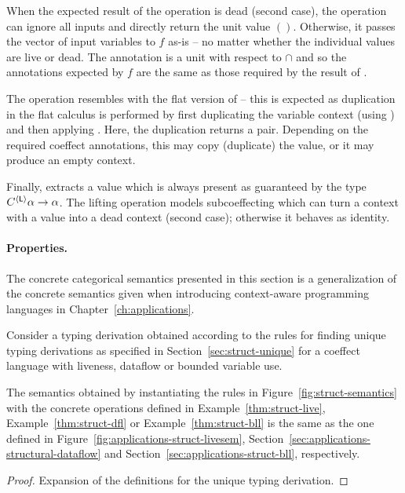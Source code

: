 \noindent
When the expected result of the  operation is dead (second case), the operation can
ignore all inputs and directly return the unit value $()$. Otherwise, it passes the vector of
input variables to $f$ as-is -- no matter whether the individual values are live or dead. The
 annotation is a unit with respect to $\cap$ and so the annotations expected by $f$ are
the same as those required by the result of .

The  operation resembles with the flat version of  -- this is expected as
duplication in the flat calculus is performed by first duplicating the variable context (using
) and then applying . Here, the duplication returns a pair. Depending on the
required coeffect annotations, this may copy (duplicate) the value, or it may produce an empty context.

Finally,  extracts a value which is always present as guaranteed by the type
$C^{\langle \textnormal{\sffamily L} \rangle}\alpha \rightarrow \alpha$. The lifting operation models
subcoeffecting which can turn a context with a value into a dead context (second case); otherwise
it behaves as identity.

\paragraph{Properties.}
The concrete categorical semantics presented in this section is a generalization of the concrete
semantics given when introducing context-aware programming languages in Chapter~\ref{ch:applications}.

\begin{theorem}[Generalization]
\label{thm:struct-generalization}

Consider a typing derivation obtained according to the rules for finding unique typing derivations
as specified in Section~\ref{sec:struct-unique} for a coeffect language with liveness, dataflow or
bounded variable use.

The semantics obtained by instantiating the rules in Figure~\ref{fig:struct-semantics} with the
concrete operations defined in Example~\ref{thm:struct-live},
Example~\ref{thm:struct-dfl} or Example~\ref{thm:struct-bll} is the
same as the one defined in Figure~\ref{fig:applications-struct-livesem},
Section~\ref{sec:applications-structural-dataflow} and Section~\ref{sec:applications-struct-bll},
respectively.
\end{theorem}
\begin{proof}
Expansion of the definitions for the unique typing derivation.
\end{proof}


